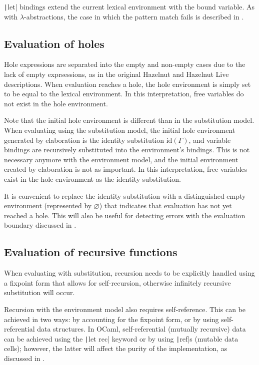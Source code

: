 
\texttt|let| bindings extend the current lexical environment with the bound variable. As with $\lambda$-abstractions, the case in which the pattern match fails is described in .

\subsection{Evaluation of holes}
\label{sec:holeenv_evalenv_connection}

Hole expressions are separated into the empty and non-empty cases due to the lack of empty exprsessions, as in the original Hazelnut and Hazelnut Live descriptions. When evaluation reaches a hole, the hole environment is simply set to be equal to the lexical environment. In this interpretation, free variables do not exist in the hole environment.

Note that the initial hole environment is different than in the substitution model. When evaluating using the substitution model, the initial hole environment generated by elaboration is the identity substitution $\text{id}({\Gamma})$, and variable bindings are recursively substituted into the environment's bindings. This is not necessary anymore with the environment model, and the initial environment created by elaboration is not as important. In this interpretation, free variables exist in the hole environment as the identity substitution.

It is convenient to replace the identity substitution with a distinguished empty environment (represented by $\varnothing$) that indicates that evaluation has not yet reached a hole. This will also be useful for detecting errors with the evaluation boundary discussed in .

\subsection{Evaluation of recursive functions}
\label{sec:rec_impl}

When evaluating with substitution, recursion needs to be explicitly handled using a fixpoint form that allows for self-recursion, otherwise infinitely recursive substitution will occur.

Recursion with the environment model also requires self-reference. This can be achieved in two ways: by accounting for the fixpoint form, or by using self-referential data structures. In OCaml, self-referential (mutually recursive) data can be achieved using the \texttt|let rec| keyword or by using \texttt|ref|s (mutable data cells); however, the latter will affect the purity of the implementation, as discussed in .

